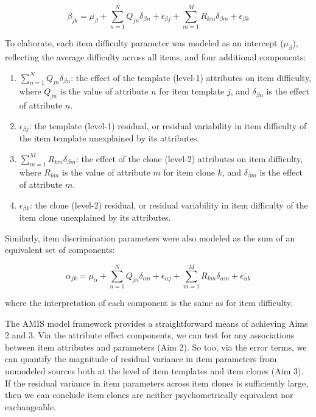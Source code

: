 \documentclass[a4paper,man,natbib]{apa6}
\begin{document}
\begin{equation}
\beta_{jk} = \mu_\beta + \sum_{n=1}^N Q_{jn} \delta_{\beta n} + \epsilon_{\beta j} + \sum_{m=1}^M R_{km} \delta_{\beta m} + \epsilon_{\beta k}
\end{equation}

\noindent To elaborate, each item difficulty parameter was modeled as an intercept ($\mu_\beta$), reflecting the average difficulty across all items, and four additional components:

\begin{enumerate}

\item $\sum_{n=1}^N Q_{jn} \delta_{\beta n}$: the effect of the template (level-1) attributes on item difficulty, where $Q_{jn}$ is the value of attribute $n$ for item template $j$, and $\delta_{\beta n}$ is the effect of attribute $n$. 

\item $\epsilon_{\beta j}$: the template (level-1) residual, or residual variability in item difficulty of the item template unexplained by its attributes.

\item $\sum_{m=1}^M R_{km} \delta_{\beta m}$: the effect of the clone (level-2) attributes on item difficulty, where $R_{km}$ is the value of attribute $m$ for item clone $k$, and $\delta_{\beta m}$ is the effect of attribute $m$. 

\item $\epsilon_{\beta k}$: the clone (level-2) residual, or residual variability in item difficulty of the item clone unexplained by its attributes.

\end{enumerate}

Similarly, item discrimination parameters were also modeled as the sum of an equivalent set of components:

\begin{equation}
\alpha_{jk} = \mu_\alpha + \sum_{n=1}^N Q_{jn} \delta_{\alpha n} + \epsilon_{\alpha j} + \sum_{m=1}^M R_{km} \delta_{\alpha m} + \epsilon_{\alpha k}
\end{equation}

\noindent where the interpretation of each component is the same as for item difficulty.

The AMIS model framework provides a straightforward means of achieving Aims 2 and 3. Via the attribute effect components, we can test for any associations between item attributes and parameters (Aim 2). So too, via the error terms, we can quantify the magnitude of residual variance in item parameters from unmodeled sources both at the level of item templates and item clones (Aim 3). If the residual variance in item parameters across item clones is sufficiently large, then we can conclude item clones are neither psychometrically equivalent nor exchangeable. 
\end{document}
